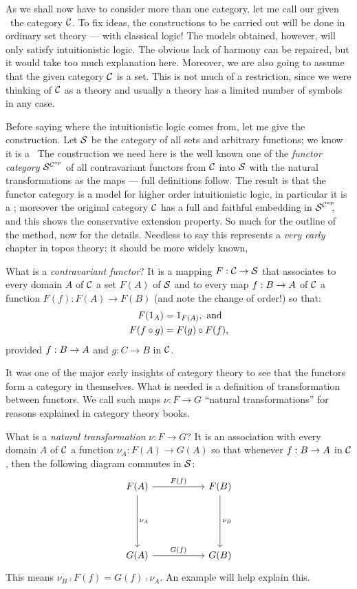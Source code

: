 As we shall now have to consider more than one category, let me call our given \ccc\ the
category $\C$. To fix ideas, the constructions to be carried out will be done in ordinary
set theory --- with classical logic! The models obtained, however, will only satisfy
intuitionistic logic. The obvious lack of harmony can be repaired, but it would take too
much explanation here. Moreover, we are also going to assume that the given category $\C$
is a set. This is not much of a restriction, since we were thinking of $\C$ as a theory
and usually a theory has a limited number of symbols in any case.

Before saying where the intuitionistic logic comes from, let me give the construction. Let
$\S$ be the category of all sets and arbitrary functions; we know it is a \ccc\  The
construction we need here is the well known one of the {\it functor category} $\scop$ of
all contravariant functors from $\C$ into $\S$ with the natural transformations as the
maps --- full definitions follow. The result is that the functor category is a model for
higher order intuitionistic logic, in particular it is a \ccc; moreover the original
category $\C$ has a full and faithful embedding in $\scop\!\!$, and this shows the
conservative extension property. So much for the outline of the method, now for the
details. Needless to say this represents a {\it very early} chapter in topos theory; it
should be more widely known,

What is a {\it contravariant functor}? It is a mapping $F: \C\to \S$ that associates to
every domain $A$ of $\C$ a set $F(A)$ of $\S$ and to every map $f: \BA$ of $\C$ a function
$F(f) : F(A) \to F(B)$ (and note the change of order!) so that:
\begin{align*}
F(\id_A) &= \id_{F(A)} , {\textrm{ and}}\\
F(f \comp g) &= F(g) \comp F(f),
\end{align*}
%
provided $f: \BA$ and $g: C \to B$ in $\C$.

It was one of the major early insights of category theory to see that the functors form a
category in themselves. What is needed is a definition of transformation between functors.
We call such maps $\nu : F \to G$ ``natural transformations'' for reasons explained in
category theory books.

What is a {\it natural transformation} $\nu : F\to G$? It is an association with every
domain $A$ of $\C$ a function $\nu_A: F(A)\to G(A)$ so that whenever $f : \BA$ in $\C$,
then the following diagram commutes in $\S$:
\[
\begin{tikzcd}[row sep=.75in, column sep = .75in]
    F(A) \arrow{d}{\nu_A} \arrow{r}{F(f)}  & F(B) \arrow{d}{\nu_B} \\
    G(A)  \arrow{r}{G(f)} & G(B)
\end{tikzcd}
\]
This means $\nu_B \comp F(f) = G(f) \comp \nu_A$. An example will help explain this.

